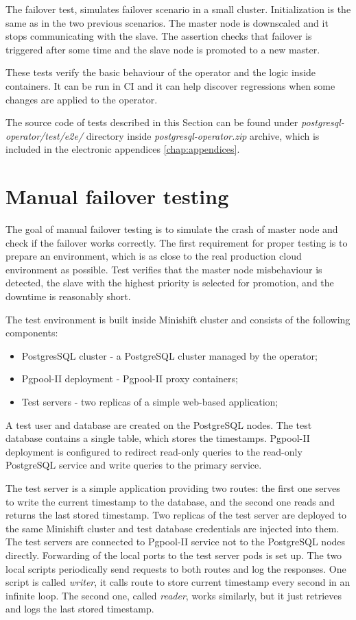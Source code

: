 \documentclass[
  digital, %
  twoside, %
  table,   %
  nolof,   %
  nolot,   %
]{fithesis3}
\begin{document}
The failover test, simulates failover scenario in a small cluster. Initialization is the same as in the two previous scenarios. The master node is downscaled and it stops communicating with the slave. The assertion checks that failover is triggered after some time and the slave node is promoted to a new master.

These tests verify the basic behaviour of the operator and the logic inside containers. It can be run in CI and it can help discover regressions when some changes are applied to the operator.

The source code of tests described in this Section can be found under \textit{postgresql-operator/test/e2e/} directory inside \textit{postgresql-operator.zip} archive, which is included in the electronic appendices \ref{chap:appendices}.

\section{Manual failover testing}
The goal of manual failover testing is to simulate the crash of master node and check if the failover works correctly. The first requirement for proper testing is to prepare an environment, which is as close to the real production cloud environment as possible. Test verifies that the master node misbehaviour is detected, the slave with the highest priority is selected for promotion, and the downtime is reasonably short.

The test environment is built inside Minishift cluster and consists of the following components:
\begin{itemize}
  \item PostgresSQL cluster - a PostgreSQL cluster managed by the operator;
  \item Pgpool-II deployment - Pgpool-II proxy containers;
  \item Test servers - two replicas of a simple web-based application;
\end{itemize}

A test user and database are created on the PostgreSQL nodes. The test database contains a single table, which stores the timestamps. Pgpool-II deployment is configured to redirect read-only queries to the read-only PostgreSQL service and write queries to the primary service.

The test server is a simple application providing two routes: the first one serves to write the current timestamp to the database, and the second one reads and returns the last stored timestamp. Two replicas of the test server are deployed to the same Minishift cluster and test database credentials are injected into them. The test servers are connected to Pgpool-II service not to the PostgreSQL nodes directly. Forwarding of the local ports to the test server pods is set up. The two local scripts periodically send requests to both routes and log the responses. One script is called \textit{writer}, it calls route to store current timestamp every second in an infinite loop. The second one, called \textit{reader}, works similarly, but it just retrieves and logs the last stored timestamp.
\end{document}
